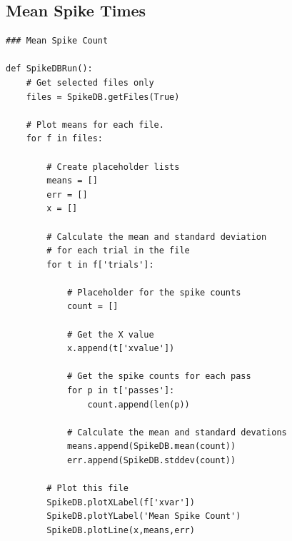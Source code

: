 \documentclass{report}
\begin{document}
\subsection{Mean Spike Times}
\begin{lstlisting}[label=codeMean,caption=Calculating the mean spike counts.]
### Mean Spike Count

def SpikeDBRun():
	# Get selected files only
	files = SpikeDB.getFiles(True)

	# Plot means for each file.
	for f in files:

		# Create placeholder lists
		means = []
		err = []
		x = []

		# Calculate the mean and standard deviation
		# for each trial in the file
		for t in f['trials']:
			
			# Placeholder for the spike counts
			count = []
			
			# Get the X value
			x.append(t['xvalue'])	

			# Get the spike counts for each pass
			for p in t['passes']:
				count.append(len(p))

			# Calculate the mean and standard devations
			means.append(SpikeDB.mean(count))
			err.append(SpikeDB.stddev(count))

		# Plot this file
		SpikeDB.plotXLabel(f['xvar'])
		SpikeDB.plotYLabel('Mean Spike Count')
		SpikeDB.plotLine(x,means,err)

\end{lstlisting}
\end{document}
